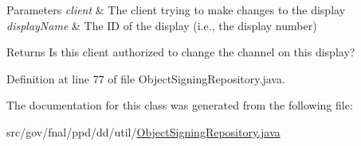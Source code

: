 \begin{DoxyParams}{Parameters}
{\em client} & The client trying to make changes to the display \\
\hline
{\em display\-Name} & The I\-D of the display (i.\-e., the display number) \\
\hline
\end{DoxyParams}
\begin{DoxyReturn}{Returns}
Is this client authorized to change the channel on this display? 
\end{DoxyReturn}


Definition at line 77 of file Object\-Signing\-Repository.\-java.



The documentation for this class was generated from the following file\-:\begin{DoxyCompactItemize}
\item 
src/gov/fnal/ppd/dd/util/\hyperlink{ObjectSigningRepository_8java}{Object\-Signing\-Repository.\-java}\end{DoxyCompactItemize}
